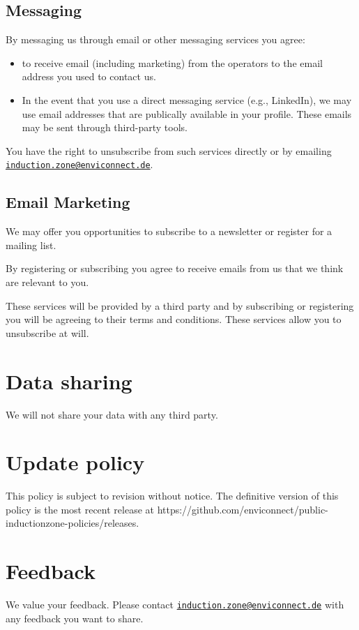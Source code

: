 \documentclass[
  10pt,
  a4paper,
]{article}
\providecommand{\tightlist}{%
  \setlength{\itemsep}{0pt}\setlength{\parskip}{0pt}}
\begin{document}
\hypertarget{messaging}{%
\subsection{Messaging}\label{messaging}}

By messaging us through email or other messaging services you agree:

\begin{itemize}
\tightlist
\item
  to receive email (including marketing) from the operators to the email
  address you used to contact us.
\item
  In the event that you use a direct messaging service (e.g., LinkedIn),
  we may use email addresses that are publically available in your
  profile. These emails may be sent through third-party tools.
\end{itemize}

You have the right to unsubscribe from such services directly or by
emailing
\href{mailto:induction.zone@enviconnect.de}{\nolinkurl{induction.zone@enviconnect.de}}.

\hypertarget{email-marketing}{%
\subsection{Email Marketing}\label{email-marketing}}

We may offer you opportunities to subscribe to a newsletter or register
for a mailing list.

By registering or subscribing you agree to receive emails from us that
we think are relevant to you.

These services will be provided by a third party and by subscribing or
registering you will be agreeing to their terms and conditions. These
services allow you to unsubscribe at will.

\hypertarget{data-sharing}{%
\section{Data sharing}\label{data-sharing}}

We will not share your data with any third party.

\hypertarget{update-policy}{%
\section{Update policy}\label{update-policy}}

This policy is subject to revision without notice. The definitive
version of this policy is the most recent release at
https://github.com/enviconnect/public-inductionzone-policies/releases.

\hypertarget{feedback}{%
\section{Feedback}\label{feedback}}

We value your feedback. Please contact
\href{mailto:induction.zone@enviconnect.de}{\nolinkurl{induction.zone@enviconnect.de}}
with any feedback you want to share.
\end{document}
